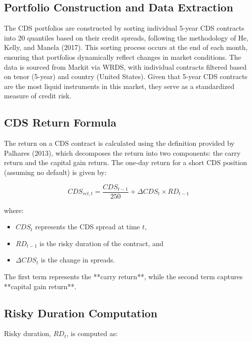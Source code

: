 \documentclass{article}
\begin{document}
\subsection{Portfolio Construction and Data Extraction}

The CDS portfolios are constructed by sorting individual 5-year CDS contracts into 20 quantiles based on their credit spreads, following the methodology of He, Kelly, and Manela (2017). This sorting process occurs at the end of each month, ensuring that portfolios dynamically reflect changes in market conditions. The data is sourced from Markit via WRDS, with individual contracts filtered based on tenor (5-year) and country (United States). Given that 5-year CDS contracts are the most liquid instruments in this market, they serve as a standardized measure of credit risk. \\

\subsection{CDS Return Formula}

The return on a CDS contract is calculated using the definition provided by Palhares (2013), which decomposes the return into two components: the carry return and the capital gain return. The one-day return for a short CDS position (assuming no default) is given by:

\begin{equation}
    CDS_{ret, t} = \frac{CDS_{t-1}}{250} + \Delta CDS_t \times RD_{t-1}
\end{equation}

where:
\begin{itemize}
    \item $CDS_t$ represents the CDS spread at time $t$,
    \item $RD_{t-1}$ is the risky duration of the contract, and
    \item $\Delta CDS_t$ is the change in spreads.
\end{itemize}

The first term represents the **carry return**, while the second term captures **capital gain return**.

\subsection{Risky Duration Computation}

Risky duration, $RD_t$, is computed as:
\end{document}
